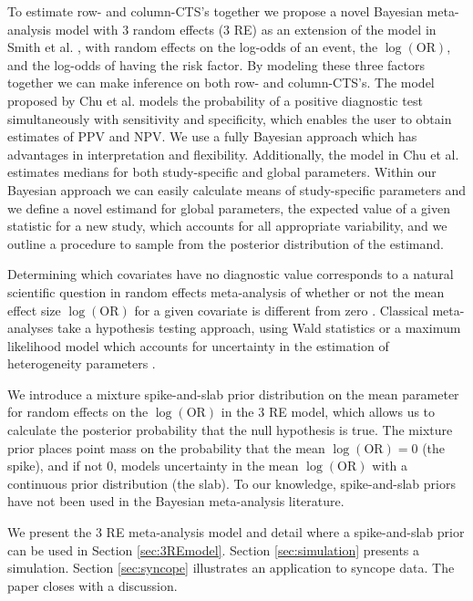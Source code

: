 \documentclass[AMA,STIX1COL]{WileyNJD-v2}
\begin{document}
To estimate row- and column-CTS's together we propose a novel Bayesian meta-analysis model with 3 random effects (3 RE) as an extension of the model in Smith et al. \cite{smith1995}, with random effects on the log-odds of an event, the $\log(\mbox{OR})$, and the log-odds of having the risk factor. By modeling these three factors together we can make inference on both row- and column-CTS's. The model proposed by Chu et al. \cite{chu2009} models the probability of a positive diagnostic test simultaneously with sensitivity and specificity, which enables the user to obtain estimates of PPV and NPV. We use a fully Bayesian approach which has advantages in interpretation and flexibility. Additionally, the model in Chu et al. estimates medians for both study-specific and global parameters. Within our Bayesian approach we can easily calculate means of study-specific parameters and we define a novel estimand for global parameters, the expected value of a given statistic for a new study, which accounts for all appropriate variability, and we outline a procedure to sample from the posterior distribution of the estimand. 

Determining which covariates have no diagnostic value corresponds to a natural scientific question in random effects meta-analysis of whether or not the mean effect size $\log(\mbox{OR})$ for a given covariate is different from zero \cite{higgins2009}. Classical meta-analyses take a hypothesis testing approach, using Wald statistics \cite{higgins2009, follmann1999} or a maximum likelihood model which accounts for uncertainty in the estimation of heterogeneity parameters \cite{hardy1996}. 

We introduce a mixture spike-and-slab prior distribution \cite{GM1993, GM1997, KM1998, ishwaran2005} on the mean parameter for random effects on the $\log(\mbox{OR})$ in the 3 RE model, which allows us to calculate the posterior probability that the null hypothesis is true. The mixture prior places point mass on the probability that the mean $\log(\mbox{OR}) = 0$ (the spike), and if not 0, models uncertainty in the mean $\log(\mbox{OR})$ with a continuous prior distribution (the slab). To our knowledge, spike-and-slab priors have not been used in the Bayesian meta-analysis literature. 

We present the 3 RE meta-analysis model and detail where a spike-and-slab prior can be used in Section \ref{sec:3REmodel}. Section \ref{sec:simulation} presents a simulation. Section \ref{sec:syncope} illustrates an application to syncope data. The paper closes with a discussion. 
\end{document}
